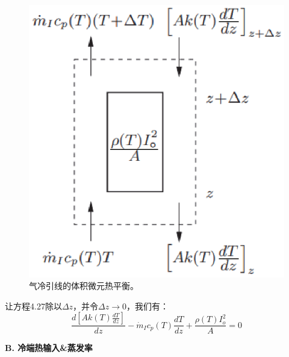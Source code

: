 \begin{figure}[htbp]
	\centering
	\includegraphics[scale=0.6]{chpt4/figs/fig4.20.eps}
	\caption{气冷引线的体积微元热平衡。}
\end{figure}

让方程4.27除以$\Delta z$，并令$\Delta z\rightarrow 0$，我们有：
\begin{equation}%
\frac{d[Ak(T)\frac{dT}{dz}]}{dz}-\dot{m}_Ic_p(T)\frac{dT}{dz}+\frac{\rho(T)I_{o}^{2}}{A}=0
\end{equation}

\textbf{B. 冷端热输入\&蒸发率}

